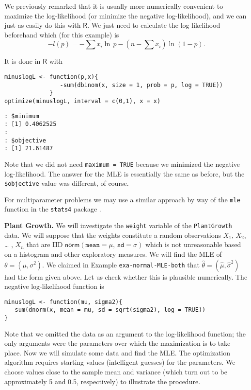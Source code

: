 We previously remarked that it is usually more numerically convenient
to maximize the log-likelihood (or minimize the negative
log-likelihood), and we can just as easily do this with
\(\mathsf{R}\). We just need to calculate the log-likelihood
beforehand which (for this example) is \[ -l(p)=-\sum x_{i}\ln\,
p-\left(n-\sum x_{i}\right)\ln(1-p).  \]

It is done in \(\mathsf{R}\) with

\begin{verbatim}
minuslogL <- function(p,x){
                -sum(dbinom(x, size = 1, prob = p, log = TRUE))
             }
optimize(minuslogL, interval = c(0,1), x = x)
\end{verbatim}

\begin{verbatim}
: $minimum
: [1] 0.4062525
: 
: $objective
: [1] 21.61487
\end{verbatim}

Note that we did not need \texttt{maximum = TRUE} because we minimized the
negative log-likelihood. The answer for the MLE is essentially the
same as before, but the \texttt{\$objective} value was different, of course.

For multiparameter problems we may use a similar approach by way of
the \texttt{mle} function in the \texttt{stats4} package \cite{stats4}.



\textbf{Plant Growth.} We will investigate the \texttt{weight} variable of the
\texttt{PlantGrowth} data. We will suppose that the weights constitute a
random observations \(X_{1}\), \(X_{2}\), \ldots{} , \(X_{n}\) that are IID
\(\mathsf{norm}(\mathtt{mean}=\mu,\,\mathtt{sd}=\sigma)\) which is not
unreasonable based on a histogram and other exploratory measures. We
will find the MLE of \(\theta=(\mu,\sigma^{2})\). We claimed in
Example \texttt{exa-normal-MLE-both} that
\(\hat{\theta}=(\hat{\mu},\hat{\sigma}^{2})\) had the form given
above. Let us check whether this is plausible numerically. The
negative log-likelihood function is

\begin{verbatim}
minuslogL <- function(mu, sigma2){
  -sum(dnorm(x, mean = mu, sd = sqrt(sigma2), log = TRUE))
}
\end{verbatim}

Note that we omitted the data as an argument to the log-likelihood
function; the only arguments were the parameters over which the
maximization is to take place. Now we will simulate some data and find
the MLE. The optimization algorithm requires starting values
(intelligent guesses) for the parameters. We choose values close to
the sample mean and variance (which turn out to be approximately 5 and
0.5, respectively) to illustrate the procedure.


